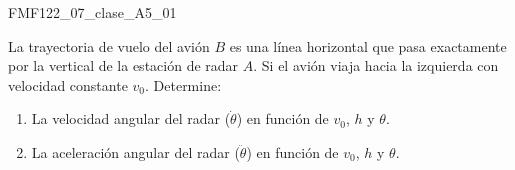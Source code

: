 \documentclass[12pt,letterpaper]{report}
\begin{document}
\begin{tareacasa}[0.6]{FMF122_07_clase_A5_01}

 La trayectoria de vuelo del avión $B$ es una línea horizontal que pasa exactamente por la vertical de la estación de radar $A$. Si el avión viaja hacia la izquierda con velocidad constante $v_0$. Determine:
 
\begin{enumerate}
\item La velocidad angular del radar ($\dot{\theta}$) en función de $v_0$, $h$ y $\theta$.
\item  La aceleración angular del radar ($\ddot{\theta}$) en función de $v_0$, $h$ y $\theta$.
\end{enumerate}

\vspace{30mm}

\end{tareacasa} 




\ifdefined\niveldos\else
\end{document}
